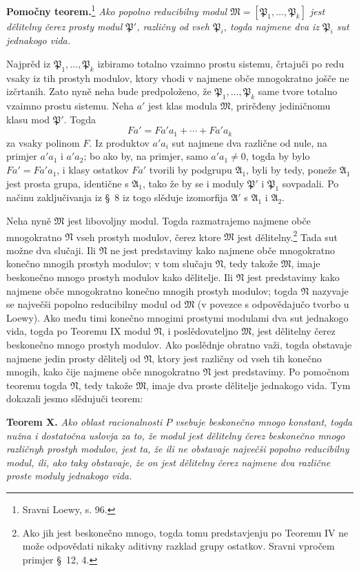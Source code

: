 \documentclass[11pt]{article}
\begin{document}
\textbf{Pomočny teorem.}\footnote{Sravni Loewy, s. 96.} \textit{Ako popolno reducibilny modul \(\mathfrak M=[\mathfrak P_1,
\ldots,
\mathfrak P_k]\) jest dělitelny čerez prosty modul \(\mathfrak P'\), različny od vseh \(\mathfrak P_i\), togda najmene dva iz \(\mathfrak P_i\) sut jednakogo vida.}

Najprěd iz \(\mathfrak P_1,
\ldots,
\mathfrak P_k\) izbiramo totalno vzaimno prostu sistemu, črtajuči po redu vsaky iz tih prostyh modulov, ktory vhodi v najmene obče mnogokratno jošče ne izčrtanih. Zato nyně neha bude predpoloženo, že \(\mathfrak P_1,
\ldots,
\mathfrak P_k\) same tvore totalno vzaimno prostu sistemu. Neha \(a'\) jest klas modula \(\mathfrak M\), prirěđeny jediničnomu klasu mod \(\mathfrak P'\). Togda
\[
 Fa'=Fa'a_1+\cdots+Fa'a_k
\]
za vsaky polinom \(F\). Iz produktov \(a'a_i\) sut najmene dva različne od nule, na primjer \(a'a_1\) i \(a'a_2\); bo ako by, na primjer, samo \(a'a_1\ne0\), togda by bylo \(Fa'=Fa'a_1\), i klasy ostatkov \(Fa'\) tvorili by podgrupu \(\mathfrak A_1\), byli by tedy, poneže \(\mathfrak A_1\) jest prosta grupa, identične s \(\mathfrak A_1\), tako že by se i moduly \(\mathfrak P'\) i \(\mathfrak P_1\) sovpadali. Po načinu zaključivanja iz \S~8 iz togo slěduje izomorfija \(\mathfrak A'\) s \(\mathfrak A_1\) i \(\mathfrak A_2\).

Neha nyně \(\mathfrak M\) jest libovoljny modul. Togda razmatrajemo najmene obče mnogokratno \(\mathfrak N\) vseh prostyh modulov, čerez ktore \(\mathfrak M\) jest dělitelny.\footnote{Ako jih jest beskonečno mnogo, togda tomu predstavjenju po Teoremu IV ne može odpovědati nikaky aditivny razklad grupy ostatkov. Sravni vpročem primjer \S~12, 4.} Tada sut možne dva slučaji. Ili \(\mathfrak N\) ne jest predstavimy kako najmene obče mnogokratno konečno mnogih prostyh modulov; v tom slučaju \(\mathfrak N\), tedy takože \(\mathfrak M\), imaje beskonečno mnogo prostyh modulov kako dělitelje. Ili \(\mathfrak N\) jest predstavimy kako najmene obče mnogokratno konečno mnogih prostyh modulov; togda \(\mathfrak N\) nazyvaje se največši popolno reducibilny modul od \(\mathfrak M\) (v povezce s odpovědajučo tvorbo u Loewy). Ako među timi konečno mnogimi prostymi modulami dva sut jednakogo vida, togda po Teoremu IX modul \(\mathfrak N\), i poslědovateljno \(\mathfrak M\), jest dělitelny čerez beskonečno mnogo prostyh modulov. Ako poslědnje obratno važi, togda obstavaje najmene jedin prosty dělitelj od \(\mathfrak N\), ktory jest različny od vseh tih konečno mnogih, kako čije najmene obče mnogokratno \(\mathfrak N\) jest predstavimy. Po pomočnom teoremu togda \(\mathfrak N\), tedy takože \(\mathfrak M\), imaje dva proste dělitelje jednakogo vida. Tym dokazali jesmo slědujuči teorem:

\textbf{Teorem X.} \textit{Ako oblast racionalnosti \(P\) vsebuje beskonečno mnogo konstant, togda nužna i dostatočna uslovja za to, že modul jest dělitelny čerez beskonečno mnogo različnyh prostyh modulov, jest ta, že ili ne obstavaje največši popolno reducibilny modul, ili, ako taky obstavaje, že on jest dělitelny čerez najmene dva različne proste moduly jednakogo vida.}
\end{document}

